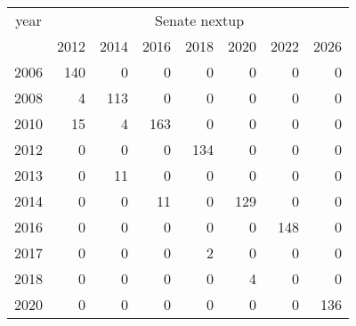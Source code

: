 \footnotesize\begin{tabular}[t]{lrrrrrrr}
\toprule
\multicolumn{1}{c}{year} & \multicolumn{7}{c}{Senate nextup} \\
\cmidrule(l{3pt}r{3pt}){1-1} \cmidrule(l{3pt}r{3pt}){2-8}
  & 2012 & 2014 & 2016 & 2018 & 2020 & 2022 & 2026\\
\midrule
2006 & 140 & 0 & 0 & 0 & 0 & 0 & 0\\
2008 & 4 & 113 & 0 & 0 & 0 & 0 & 0\\
2010 & 15 & 4 & 163 & 0 & 0 & 0 & 0\\
2012 & 0 & 0 & 0 & 134 & 0 & 0 & 0\\
2013 & 0 & 11 & 0 & 0 & 0 & 0 & 0\\
2014 & 0 & 0 & 11 & 0 & 129 & 0 & 0\\
2016 & 0 & 0 & 0 & 0 & 0 & 148 & 0\\
2017 & 0 & 0 & 0 & 2 & 0 & 0 & 0\\
2018 & 0 & 0 & 0 & 0 & 4 & 0 & 0\\
2020 & 0 & 0 & 0 & 0 & 0 & 0 & 136\\
\bottomrule
\end{tabular}
